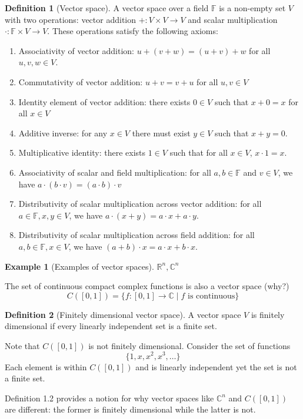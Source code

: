 \documentclass[answers,12pt]{exam}
\theoremstyle{definition}
\newtheorem{definition}{Definition}[section]
\newtheorem{example}{Example}[section]
\begin{document}
\begin{definition}[Vector space]
    A vector space over a field $\mathbb{F}$ is a non-empty set $V$ with two operations: vector addition $+ : V \times V \to V$ and scalar multiplication $\cdot: \mathbb{F} \times V \to V$.
    These operations satisfy the following axioms:
    \begin{enumerate}
        \item Associativity of vector addition: $u + (v + w) = (u + v) + w$ for all $u, v, w \in V$.
        \item Commutativity of vector addition: $u + v = v + u$ for all $u, v \in V$
        \item Identity element of vector addition: there exists $0 \in V$ such that $x + 0 = x$ for all $x \in V$
        \item Additive inverse: for any $x \in V$ there must exist $y \in V$ such that $x+y=0$.
        \item Multiplicative identity: there exists $1 \in V$ such that for all $x \in V$, $x \cdot 1 = x$.
        \item Associativity of scalar and field multiplication: for all $a, b \in \mathbb{F}$ and $v \in V$, we have $a \cdot (b \cdot v) = (a \cdot b) \cdot v$
        \item Distributivity of scalar multiplication across vector addition: for all $a \in \mathbb{F}, x,y \in V$, we have $a \cdot (x+y) = a \cdot x + a \cdot y$.
        \item Distributivity of scalar multiplication across field addition: for all $a,b \in \mathbb{F}, x \in V$, we have $(a + b) \cdot x = a \cdot x + b \cdot x$.
    \end{enumerate}
\end{definition}

\begin{example}[Examples of vector spaces]
    $\mathbb{R}^n, \mathbb{C}^n$
    
    The set of continuous compact complex functions is also a vector space (why?)
    \[
        C([0,1]) = \big\{ f: [0,1] \to \mathbb{C} \mid f \text{ is continuous} \big\}
    \]
\end{example}

\begin{definition}[Finitely dimensional vector space]
    A vector space $V$ is finitely dimensional if every linearly independent set is a finite set.    
\end{definition}

Note that $C([0,1])$ is not finitely dimensional.
Consider the set of functions \[\{1, x, x^2, x^3, \dots \}\]
Each element is within $C([0,1])$ and is linearly independent yet the set is not a finite set.

Definition 1.2 provides a notion for why vector spaces like $\mathbb{C}^n$ and $C([0,1])$ are different: the former is finitely dimensional while the latter is not.
\end{document}
